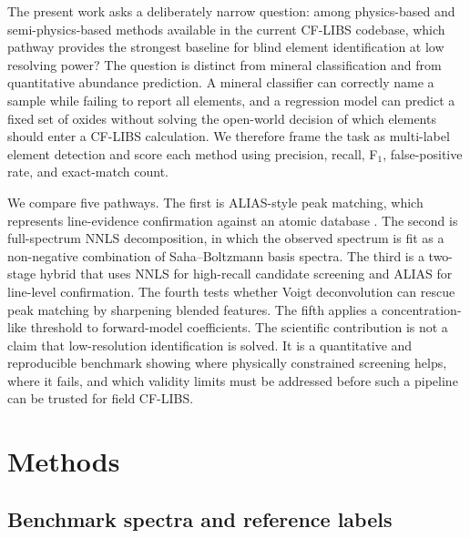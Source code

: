 \documentclass[preprint,12pt,authoryear]{elsarticle}
\begin{document}
The present work asks a deliberately narrow question: among physics-based and semi-physics-based methods available in the current CF-LIBS codebase, which pathway provides the strongest baseline for blind element identification at low resolving power? The question is distinct from mineral classification and from quantitative abundance prediction. A mineral classifier can correctly name a sample while failing to report all elements, and a regression model can predict a fixed set of oxides without solving the open-world decision of which elements should enter a CF-LIBS calculation. We therefore frame the task as multi-label element detection and score each method using precision, recall, F$_1$, false-positive rate, and exact-match count.

We compare five pathways. The first is ALIAS-style peak matching, which represents line-evidence confirmation against an atomic database \citep{Labutin2013,Amato2010}. The second is full-spectrum NNLS decomposition, in which the observed spectrum is fit as a non-negative combination of Saha--Boltzmann basis spectra. The third is a two-stage hybrid that uses NNLS for high-recall candidate screening and ALIAS for line-level confirmation. The fourth tests whether Voigt deconvolution can rescue peak matching by sharpening blended features. The fifth applies a concentration-like threshold to forward-model coefficients. The scientific contribution is not a claim that low-resolution identification is solved. It is a quantitative and reproducible benchmark showing where physically constrained screening helps, where it fails, and which validity limits must be addressed before such a pipeline can be trusted for field CF-LIBS.

\section{Methods}

\subsection{Benchmark spectra and reference labels}
\end{document}
